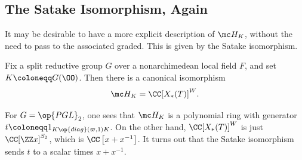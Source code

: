 \documentclass[../notes.tex]{subfiles}
\begin{document}
\subsection{The Satake Isomorphism, Again}
It may be desirable to have a more explicit description of $\mc H_K$, without the need to pass to the associated graded. This is given by the Satake isomorphism.
\begin{theorem}[Satake]
	Fix a split reductive group $G$ over a nonarchimedean local field $F$, and set $K\coloneqq G(\OO)$. Then there is a canonical isomorphism
	\[\mc H_K=\CC[X_*(T)]^W.\]
\end{theorem}
\begin{example}
	For $G=\op{PGL}_2$, one sees that $\mc H_K$ is a polynomial ring with generator $t\coloneqq1_{K\op{diag}(\varpi,1)K}$. On the other hand, $\CC[X_*(T)]^W$ is just $\CC[\ZZ x]^{S_2}$, which is $\CC\left[x+x^{-1}\right]$. It turns out that the Satake isomorphism sends $t$ to a scalar times $x+x^{-1}$.
\end{example}
\end{document}
